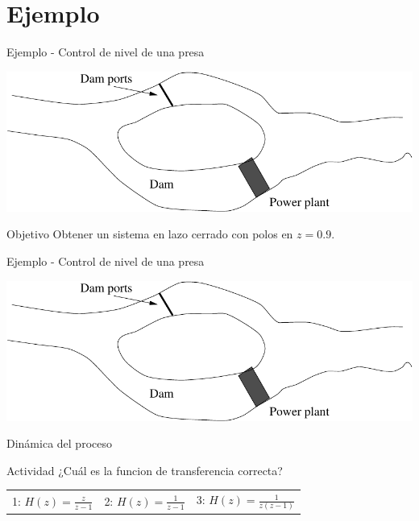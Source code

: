 \documentclass[presentation,aspectratio=169]{beamer}
\begin{document}
\section{Ejemplo}
\label{sec:org6aaff96}
\begin{frame}[label={sec:orgb363975}]{Ejemplo - Control de nivel de una presa}
\begin{center}
\includegraphics[width=0.5\linewidth]{../../figures/kraftverk}
\end{center}

\alert{Objetivo} Obtener un sistema en lazo cerrado con polos en \(z=0.9\).
\end{frame}

\begin{frame}[label={sec:org5253283}]{Ejemplo - Control de nivel de una presa}
\begin{center}
\includegraphics[width=0.5\linewidth]{../../figures/kraftverk}
\end{center}

\alert{Dinámica del proceso}

\begin{center}
\end{center}

\alert{Actividad} ¿Cuál es la funcion de transferencia correcta?

\begin{center}
\begin{tabular}{lll}
1: \(H(z) = \frac{z}{z-1}\) & 2: \(H(z)=\frac{1}{z-1}\) & 3: \(H(z)=\frac{1}{z(z-1)}\)\\
\end{tabular}
\end{center}
\end{frame}
\end{document}
